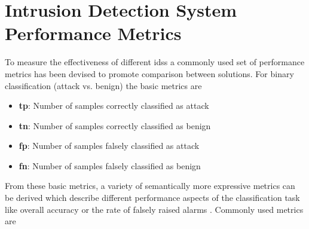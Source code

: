 \section{Intrusion Detection System Performance Metrics} \label{sec:background:metrics}

To measure the effectiveness of different \glspl{ids} a commonly used set of performance metrics has been devised to promote comparison between solutions. For binary classification (attack vs. benign) the basic metrics are

\begin{itemize}
	\item \textbf{\gls{tp}}: Number of samples correctly classified as attack
	\item \textbf{\gls{tn}}: Number of samples correctly classified as benign
	\item \textbf{\gls{fp}}: Number of samples falsely classified as attack
	\item \textbf{\gls{fn}}: Number of samples falsely classified as benign
\end{itemize}

From these basic metrics, a variety of semantically more expressive metrics can be derived which describe different performance aspects of the classification task like overall accuracy or the rate of falsely raised alarms \cite{confusion_matrix}. Commonly used metrics are 

